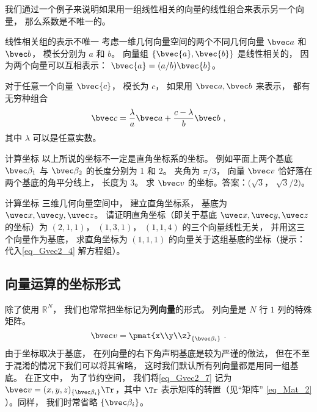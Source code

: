 我们通过一个例子来说明如果用一组线性相关的向量的线性组合来表示另一个向量， 那么系数是不唯一的。

\begin{example}{线性相关组的表示不唯一}
考虑一维几何向量空间的两个不同几何向量 $\bvec a$ 和 $\bvec b$， 模长分别为 $a$ 和 $b$。 向量组 $\{\bvec{a}, \bvec{b}\}$ 是线性相关的， 因为两个向量可以互相表示： $\bvec{a}=(a/b)\bvec{b}$。

对于任意一个向量 $\bvec{c}$， 模长为 $c$， 如果用 $\bvec a, \bvec b$ 来表示， 都有无穷种组合
\begin{equation}
\bvec c = \frac{\lambda}{a} \bvec a + \frac{c - \lambda}{b} \bvec b~,
\end{equation}
其中 $\lambda$ 可以是任意实数。
\end{example}

\begin{exercise}{计算坐标}
以上所说的坐标不一定是直角坐标系的坐标。 例如平面上两个基底 $\bvec \beta_1$ 与 $\bvec \beta_2$ 的长度分别为 1 和 2。 夹角为 $\pi/3$， 向量 $\bvec v$ 恰好落在两个基底的角平分线上， 长度为 3。 求 $\bvec v$ 的坐标。答案：$(\sqrt 3$， $\sqrt 3/2)$。
\end{exercise}

\begin{exercise}{计算坐标}
三维几何向量空间中， 建立直角坐标系， 基底为 $\uvec x, \uvec y, \uvec z$。 请证明直角坐标（即关于基底 $\uvec x, \uvec y, \uvec z$ 的坐标）为 $(2, 1, 1)$， $(1, 3, 1)$， $(1, 1, 4)$ 的三个向量线性无关， 并用这三个向量作为基底， 求直角坐标为 $(1, 1, 1)$ 的向量关于这组基底的坐标（提示：代入\autoref{eq_Gvec2_4} 解方程组）。
\end{exercise}

\subsection{向量运算的坐标形式}
除了使用 $\mathbb R^N$， 我们也常常把坐标记为\textbf{列向量}的形式。 列向量是 $N$ 行 $1$ 列的特殊矩阵。
\begin{equation}\label{eq_Gvec2_7}
\bvec v = \pmat{x\\y\\z}_{\{\bvec\beta_i\}}~.
\end{equation}
由于坐标取决于基底， 在列向量的右下角声明基底是较为严谨的做法， 但在不至于混淆的情况下我们可以将其省略， 这时我们默认所有列向量都是用同一组基底。 在正文中， 为了节约空间， 我们将\autoref{eq_Gvec2_7} 记为 $\bvec v = (x, y, z)_{\{\bvec\beta_i\}}\Tr$，其中 $\Tr$ 表示矩阵的转置（见“矩阵” \autoref{eq_Mat_2} ）。同样， 我们时常省略 $\{\bvec\beta_i\}$。

